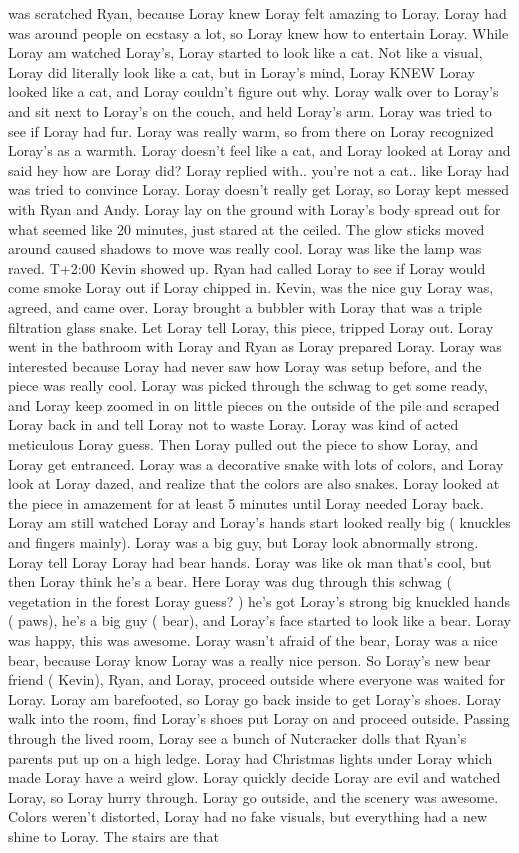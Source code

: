 \documentclass[12pt]{book}
\begin{document}
was scratched Ryan, because Loray knew Loray felt amazing to Loray. Loray had was around people on ecstasy a lot, so Loray knew how to entertain Loray. While Loray am watched Loray's, Loray started to look like a cat. Not like a visual, Loray did literally look like a cat, but in Loray's mind, Loray KNEW Loray looked like a cat, and Loray couldn't figure out why. Loray walk over to Loray's and sit next to Loray's on the couch, and held Loray's arm. Loray was tried to see if Loray had fur. Loray was really warm, so from there on Loray recognized Loray's as a warmth. Loray doesn't feel like a cat, and Loray looked at Loray and said hey how are Loray did? Loray replied with.. you're not a cat.. like Loray had was tried to convince Loray. Loray doesn't really get Loray, so Loray kept messed with Ryan and Andy. Loray lay on the ground with Loray's body spread out for what seemed like 20 minutes, just stared at the ceiled. The glow sticks moved around caused shadows to move was really cool. Loray was like the lamp was raved. T+2:00 Kevin showed up. Ryan had called Loray to see if Loray would come smoke Loray out if Loray chipped in. Kevin, was the nice guy Loray was, agreed, and came over. Loray brought a bubbler with Loray that was a triple filtration glass snake. Let Loray tell Loray, this piece, tripped Loray out. Loray went in the bathroom with Loray and Ryan as Loray prepared Loray. Loray was interested because Loray had never saw how Loray was setup before, and the piece was really cool. Loray was picked through the schwag to get some ready, and Loray keep zoomed in on little pieces on the outside of the pile and scraped Loray back in and tell Loray not to waste Loray. Loray was kind of acted meticulous Loray guess. Then Loray pulled out the piece to show Loray, and Loray get entranced. Loray was a decorative snake with lots of colors, and Loray look at Loray dazed, and realize that the colors are also snakes. Loray looked at the piece in amazement for at least 5 minutes until Loray needed Loray back. Loray am still watched Loray and Loray's hands start looked really big ( knuckles and fingers mainly). Loray was a big guy, but Loray look abnormally strong. Loray tell Loray Loray had bear hands. Loray was like ok man that's cool, but then Loray think he's a bear. Here Loray was dug through this schwag ( vegetation in the forest Loray guess? ) he's got Loray's strong big knuckled hands ( paws), he's a big guy ( bear), and Loray's face started to look like a bear. Loray was happy, this was awesome. Loray wasn't afraid of the bear, Loray was a nice bear, because Loray know Loray was a really nice person. So Loray's new bear friend ( Kevin), Ryan, and Loray, proceed outside where everyone was waited for Loray. Loray am barefooted, so Loray go back inside to get Loray's shoes. Loray walk into the room, find Loray's shoes put Loray on and proceed outside. Passing through the lived room, Loray see a bunch of Nutcracker dolls that Ryan's parents put up on a high ledge. Loray had Christmas lights under Loray which made Loray have a weird glow. Loray quickly decide Loray are evil and watched Loray, so Loray hurry through. Loray go outside, and the scenery was awesome. Colors weren't distorted, Loray had no fake visuals, but everything had a new shine to Loray. The stairs are that 
\end{document}
